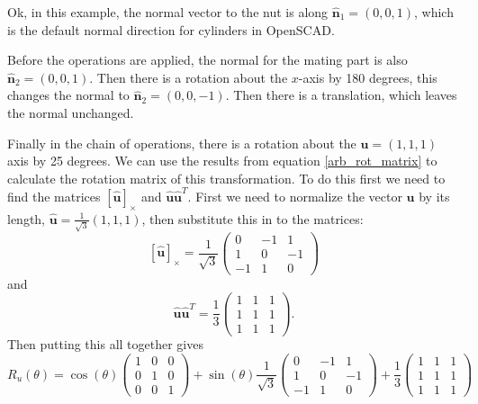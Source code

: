  Ok, in this example, the normal vector to the nut is along $\hat{\textbf{n}}_{1} = \left( 0, 0, 1 \right)$, which is the default normal direction for cylinders in OpenSCAD. 
 
 Before the operations are applied, the normal for the mating part is also $\hat{\textbf{n}}_{2} = \left( 0, 0, 1 \right)$. Then there is a rotation about the $x$-axis by 180 degrees, this changes the normal to $\hat{\textbf{n}}_{2} = \left( 0, 0, -1 \right)$. Then there is a translation, which leaves the normal unchanged. 
 
 Finally in the chain of operations, there is a rotation about the $\textbf{u} = (1,1,1)$ axis by 25 degrees. We can use the results from equation \ref{arb_rot_matrix} to calculate the rotation matrix of this transformation. To do this first we need to find the matrices $\left[ \hat{\textbf{u}} \right]_{\times}$ and $\hat{\textbf{u}} \hat{\textbf{u}}^{T}$. First we need to normalize the vector $\textbf{u}$ by its length, $\hat{\textbf{u}} = \tfrac{1}{\sqrt{3}} (1,1,1)$, then substitute this in to the matrices: 
 \begin{equation}
    \left[ \hat{\textbf{u}} \right]_{\times} = \frac{1}{\sqrt{3}}  \begin{pmatrix} 0 & -1 & 1 \\ 1 & 0 & -1 \\ -1 & 1 & 0 \end{pmatrix}
 \end{equation}
 and 
\begin{equation}
  \hat{\textbf{u}} \hat{\textbf{u}}^{T} = \frac{1}{3} \begin{pmatrix} 1 & 1 & 1 \\ 1 & 1 & 1 \\ 1 & 1 & 1 \end{pmatrix}. 
\end{equation}
Then putting this all together gives
\begin{equation}
 R_{u} \left(\theta \right) = \cos \left( \theta \right) \begin{pmatrix} 1 & 0 & 0 \\ 0 & 1 & 0 \\ 0 & 0 & 1 \end{pmatrix} + \sin \left( \theta \right) \frac{1}{\sqrt{3}}  \begin{pmatrix} 0 & -1 & 1 \\ 1 & 0 & -1 \\ -1 & 1 & 0 \end{pmatrix}  + \frac{1}{3}\begin{pmatrix} 1 & 1 & 1 \\ 1 & 1 & 1 \\ 1 & 1 & 1 \end{pmatrix} 
\end{equation}


